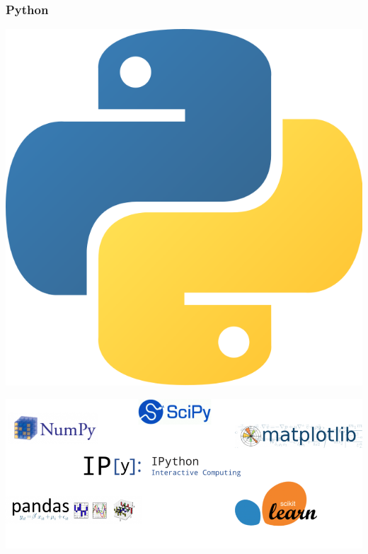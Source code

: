 \begin{frame}
    \frametitle{Python}
    \centering
    \includegraphics[scale=0.06]{Bin/python_logo.png}

    \vspace{1cm}
    \pause

    \includegraphics[scale=0.3]{Bin/python_libraries.png}

\end{frame}



